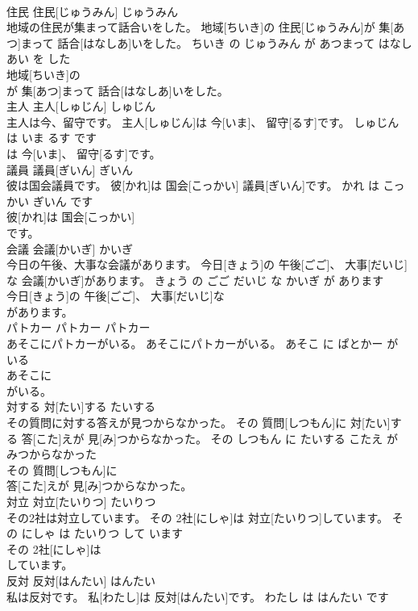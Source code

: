 \documentclass[8pt]{extreport}
\begin{document}
\begin{CJK}{UTF8}{min}
\\	住民	住民[じゅうみん]	じゅうみん	
\\	地域の住民が集まって話合いをした。	地域[ちいき]の 住民[じゅうみん]が 集[あつ]まって 話合[はなしあ]いをした。	ちいき の じゅうみん が あつまって はなしあい を した	
\\	地域[ちいき]の
\\	が 集[あつ]まって 話合[はなしあ]いをした。			
\\	主人	主人[しゅじん]	しゅじん	
\\	主人は今、留守です。	主人[しゅじん]は 今[いま]、 留守[るす]です。	しゅじん は いま るす です	
\\	は 今[いま]、 留守[るす]です。			
\\	議員	議員[ぎいん]	ぎいん	
\\	彼は国会議員です。	彼[かれ]は 国会[こっかい] 議員[ぎいん]です。	かれ は こっかい ぎいん です	
\\	彼[かれ]は 国会[こっかい]
\\	です。			
\\	会議	会議[かいぎ]	かいぎ	
\\	今日の午後、大事な会議があります。	今日[きょう]の 午後[ごご]、 大事[だいじ]な 会議[かいぎ]があります。	きょう の ごご だいじ な かいぎ が あります	
\\	今日[きょう]の 午後[ごご]、 大事[だいじ]な
\\	があります。			
\\	パトカー	パトカー	パトカー	
\\	あそこにパトカーがいる。	あそこにパトカーがいる。	あそこ に ぱとかー が いる	
\\	あそこに
\\	がいる。			
\\	対する	対[たい]する	たいする	
\\	その質問に対する答えが見つからなかった。	その 質問[しつもん]に 対[たい]する 答[こた]えが 見[み]つからなかった。	その しつもん に たいする こたえ が みつからなかった	
\\	その 質問[しつもん]に
\\	答[こた]えが 見[み]つからなかった。			
\\	対立	対立[たいりつ]	たいりつ	
\\	その2社は対立しています。	その 2社[にしゃ]は 対立[たいりつ]しています。	その にしゃ は たいりつ して います	
\\	その 2社[にしゃ]は
\\	しています。			
\\	反対	反対[はんたい]	はんたい	
\\	私は反対です。	私[わたし]は 反対[はんたい]です。	わたし は はんたい です	

\end{CJK}
\end{document}
